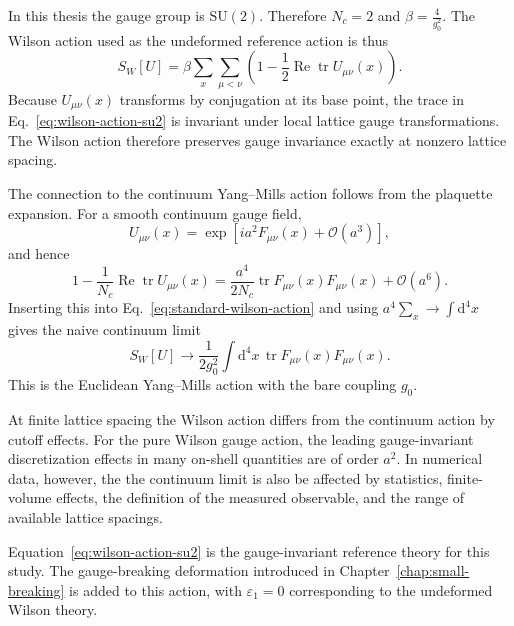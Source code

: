 \documentclass[12pt,a4paper,oneside,numbers=noenddot]{scrreprt}
\newcommand{\SU}{\mathrm{SU}}
\newcommand{\dd}{\mathrm{d}}
\newcommand{\order}{\mathcal{O}}
\newcommand{\eps}{\varepsilon}
\newcommand{\latspacing}{a}
\begin{document}
In this thesis the gauge group is \(\SU(2)\). Therefore \(N_c=2\) and
\(\beta = \frac{4}{g_0^2}.\)
The Wilson action used as the undeformed reference action is thus
\begin{equation}
  S_W[U]
  =
  \beta
  \sum_x
  \sum_{\mu<\nu}
  \left(
    1
    -
    \frac{1}{2}
    \operatorname{Re}\operatorname{tr}
    U_{\mu\nu}(x)
  \right).
  \label{eq:wilson-action-su2}
\end{equation}
Because \(U_{\mu\nu}(x)\) transforms by conjugation at its base point, the trace
in Eq.~\eqref{eq:wilson-action-su2} is invariant under local lattice gauge
transformations. The Wilson action therefore preserves gauge invariance exactly
at nonzero lattice spacing.

The connection to the continuum Yang--Mills action follows from the plaquette
expansion. For a smooth continuum gauge field,
\begin{equation}
  U_{\mu\nu}(x)
  =
  \exp\left[
    i\latspacing^2 F_{\mu\nu}(x)
    +
    \order(\latspacing^3)
  \right],
  \label{eq:plaquette-expansion-action}
\end{equation}
and hence
\begin{equation}
  1
  -
  \frac{1}{N_c}
  \operatorname{Re}\operatorname{tr} U_{\mu\nu}(x)
  =
  \frac{\latspacing^4}{2N_c}
  \operatorname{tr}
  F_{\mu\nu}(x)F_{\mu\nu}(x)
  +
  \order(\latspacing^6).
  \label{eq:wilson-action-plaquette-expansion}
\end{equation}
Inserting this into Eq.~\eqref{eq:standard-wilson-action} and using
\(\latspacing^4\sum_x \to \int \dd^4x\) gives the naive continuum limit
\begin{equation}
  S_W[U]
  \longrightarrow
  \frac{1}{2g_0^2}
  \int \dd^4x\,
  \operatorname{tr}
  F_{\mu\nu}(x)F_{\mu\nu}(x).
  \label{eq:wilson-action-continuum-limit}
\end{equation}
This is the Euclidean Yang--Mills action with the bare coupling \(g_0\).

At finite lattice spacing the Wilson action differs from the continuum action
by cutoff effects. For the pure Wilson gauge action, the leading
gauge-invariant discretization effects in many on-shell quantities are of
order \(\latspacing^2\). In numerical data, however, the
the continuum limit is also be affected by statistics, finite-volume effects, the
definition of the measured observable, and the range of available lattice
spacings.

Equation~\eqref{eq:wilson-action-su2} is the gauge-invariant reference theory
for this study. The gauge-breaking deformation introduced in
Chapter~\ref{chap:small-breaking} is added to this action, with
\(\eps_1=0\) corresponding to the undeformed Wilson theory.
\end{document}

